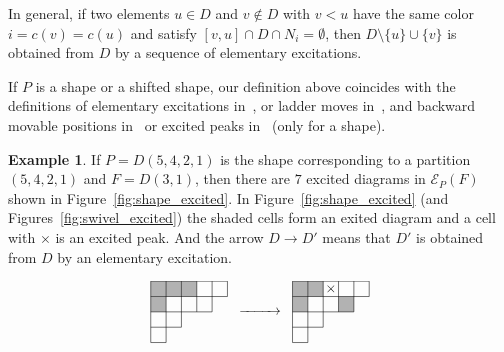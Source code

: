 \documentclass[10pt]{amsart}
\theoremstyle{definition}
\newtheorem{exam}[theo]{Example}
\theoremstyle{remark}
\newcommand\EE{\mathcal{E}}
\begin{document}
In general, if two elements $u \in D$ and $v \not\in D$ with $v < u$ 
have the same color $i = c(v) = c(u)$ and satisfy $[v,u] \cap D \cap N_i = \emptyset$, 
then $D \setminus \{ u \} \cup \{ v \}$ is obtained from $D$ by a sequence 
of elementary excitations.

If $P$ is a shape or a shifted shape, our definition above coincides with the definitions of 
elementary excitations in~\cite{IN1, IN2}, 
or ladder moves in~\cite{Kr1, Kr2}, 
and backward movable positions in~\cite{IN2, KN} 
or excited peaks in~\cite{MPP} (only for a shape).

\begin{exam}
\label{ex:shape_excited}
If $P = D(5,4,2,1)$ is the shape corresponding to a partition $(5,4,2,1)$ and 
$F = D(3,1)$, then there are $7$ excited diagrams in $\EE_P(F)$ shown in Figure~\ref{fig:shape_excited}.
In Figure~\ref{fig:shape_excited} (and Figures~\ref{fig:swivel_excited}) 
the shaded cells form an exited diagram and a cell with $\times$ is an excited peak.
And the arrow $D \longrightarrow D'$ means that $D'$ is obtained from $D$ by an elementary excitation.
\begin{figure}[t]
$$
\setlength{\unitlength}{1.1pt}
\begin{CD}
\raisebox{-20pt}{
\begin{picture}(50,40)
\fboxsep=0mm
\put(0,30){\colorbox[gray]{0.7}{\makebox(10,10){}}}
\put(10,30){\colorbox[gray]{0.7}{\makebox(10,10){}}}
\put(20,30){\colorbox[gray]{0.7}{\makebox(10,10){}}}
\put(0,20){\colorbox[gray]{0.7}{\makebox(10,10){}}}
\put(0,40){\line(1,0){50}}
\put(0,30){\line(1,0){50}}
\put(0,20){\line(1,0){40}}
\put(0,10){\line(1,0){20}}
\put(0,0){\line(1,0){10}}
\put(0,0){\line(0,1){40}}
\put(10,0){\line(0,1){40}}
\put(20,10){\line(0,1){30}}
\put(30,20){\line(0,1){20}}
\put(40,20){\line(0,1){20}}
\put(50,30){\line(0,1){10}}
\end{picture}
}
@>>>
\raisebox{-20pt}{
\begin{picture}(50,40)
\fboxsep=0mm
\put(0,30){\colorbox[gray]{0.7}{\makebox(10,10){}}}
\put(10,30){\colorbox[gray]{0.7}{\makebox(10,10){}}}
\put(30,20){\colorbox[gray]{0.7}{\makebox(10,10){}}}
\put(0,20){\colorbox[gray]{0.7}{\makebox(10,10){}}}
\put(0,40){\line(1,0){50}}
\put(0,30){\line(1,0){50}}
\put(0,20){\line(1,0){40}}
\put(0,10){\line(1,0){20}}
\put(0,0){\line(1,0){10}}
\put(0,0){\line(0,1){40}}
\put(10,0){\line(0,1){40}}
\put(20,10){\line(0,1){30}}
\put(30,20){\line(0,1){20}}
\put(40,20){\line(0,1){20}}
\put(50,30){\line(0,1){10}}
\put(20,30){\makebox(10,10){$\times$}}
\end{picture}
}
\end{CD}$$
\end{figure}
\end{exam}
\end{document}
